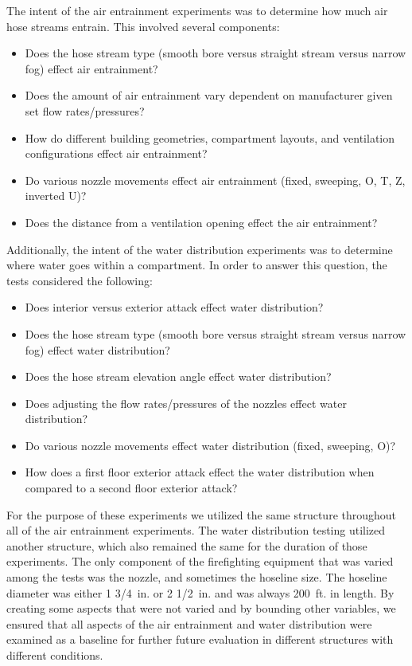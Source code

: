 \documentclass{article}
\begin{document}
The intent of the air entrainment experiments was to determine how much air hose streams entrain. This involved several components:

\begin{itemize}
	\item Does the hose stream type (smooth bore versus straight stream versus narrow fog) effect air entrainment?
	\item Does the amount of air entrainment vary dependent on manufacturer given set flow rates/pressures?
	\item How do different building geometries, compartment layouts, and ventilation configurations effect air entrainment?
	\item Do various nozzle movements effect air entrainment (fixed, sweeping, O, T, Z, inverted U)?
	\item Does the distance from a ventilation opening effect the air entrainment?

\end{itemize}

Additionally, the intent of the water distribution experiments was to determine where water goes within a compartment. In order to answer this question, the tests considered the following:

\begin{itemize}
	\item Does interior versus exterior attack effect water distribution?
	\item Does the hose stream type (smooth bore versus straight stream versus narrow fog) effect water distribution? 
	\item Does the hose stream elevation angle effect water distribution?
	\item Does adjusting the flow rates/pressures of the nozzles effect water distribution? 
	\item Do various nozzle movements effect water distribution (fixed, sweeping, O)?
	\item How does a first floor exterior attack effect the water distribution when compared to a second floor exterior attack?
\end{itemize}

For the purpose of these experiments we utilized the same structure throughout all of the air entrainment experiments. The water distribution testing utilized another structure, which also remained the same for the duration of those experiments. The only component of the firefighting equipment that was varied among the tests was the nozzle, and sometimes the hoseline size. The hoseline diameter was either 1 3/4~in. or 2 1/2~in. and was always 200~ft. in length. By creating some aspects that were not varied and by bounding other variables, we ensured that all aspects of the air entrainment and water distribution were examined as a baseline for further future evaluation in different structures with different conditions.
\end{document}
